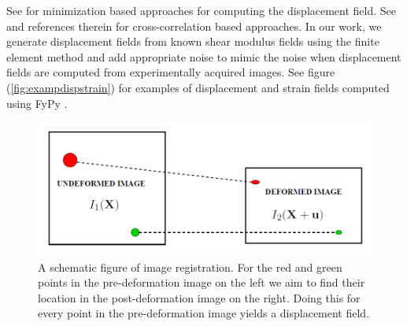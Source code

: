 \documentclass[12pt]{article}
\begin{document}
See \cite{paper:richards2009,paper:gokhale2004,paper:pellot-barakat2004} for minimization based approaches for computing the displacement field. See \cite{paper:ophir1991,paper:ophir1996,paper:alam1998} and references therein for cross-correlation based approaches. In our work, we generate displacement fields from known shear modulus fields using the finite element method \cite{book:hugheslinear,book:fishbelytschko} and add appropriate noise to mimic the noise when displacement fields are computed from experimentally acquired images. See figure (\ref{fig:exampdispstrain}) for examples of displacement and strain fields computed using FyPy \cite{misc:fypy}.
%
\begin{figure}[!h]
  \centering
  \includegraphics[totalheight=4cm]{Figures/regist.png}
  \caption{\label{fig:registschematic} A schematic figure of image registration. For the red and green points in the pre-deformation image on the left we aim to find their location in the post-deformation image on the right. Doing this for every point in the pre-deformation image yields a displacement field.}
\end{figure}
%
\end{document}
